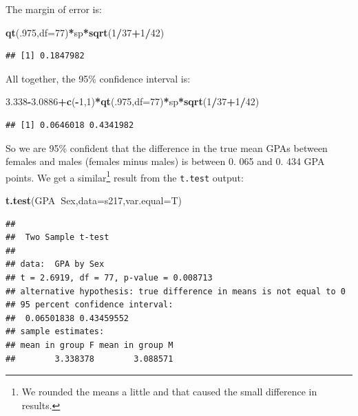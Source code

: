 \documentclass[]{book}
\newenvironment{Shaded}{\begin{snugshade}}{\end{snugshade}}
\newcommand{\KeywordTok}[1]{\textcolor[rgb]{0.13,0.29,0.53}{\textbf{#1}}}
\newcommand{\DataTypeTok}[1]{\textcolor[rgb]{0.13,0.29,0.53}{#1}}
\newcommand{\DecValTok}[1]{\textcolor[rgb]{0.00,0.00,0.81}{#1}}
\newcommand{\FloatTok}[1]{\textcolor[rgb]{0.00,0.00,0.81}{#1}}
\newcommand{\OperatorTok}[1]{\textcolor[rgb]{0.81,0.36,0.00}{\textbf{#1}}}
\newcommand{\NormalTok}[1]{#1}
\let\rmarkdownfootnote\footnote%
\def\footnote{\protect\rmarkdownfootnote}
\begin{document}
The margin of error is:

\begin{Shaded}
\begin{Highlighting}[]
\KeywordTok{qt}\NormalTok{(.}\DecValTok{975}\NormalTok{,}\DataTypeTok{df=}\DecValTok{77}\NormalTok{)}\OperatorTok{*}\NormalTok{sp}\OperatorTok{*}\KeywordTok{sqrt}\NormalTok{(}\DecValTok{1}\OperatorTok{/}\DecValTok{37}\OperatorTok{+}\DecValTok{1}\OperatorTok{/}\DecValTok{42}\NormalTok{)}
\end{Highlighting}
\end{Shaded}

\begin{verbatim}
## [1] 0.1847982
\end{verbatim}

All together, the 95\% confidence interval is:

\begin{Shaded}
\begin{Highlighting}[]
\FloatTok{3.338}\OperatorTok{-}\FloatTok{3.0886}\OperatorTok{+}\KeywordTok{c}\NormalTok{(}\OperatorTok{-}\DecValTok{1}\NormalTok{,}\DecValTok{1}\NormalTok{)}\OperatorTok{*}\KeywordTok{qt}\NormalTok{(.}\DecValTok{975}\NormalTok{,}\DataTypeTok{df=}\DecValTok{77}\NormalTok{)}\OperatorTok{*}\NormalTok{sp}\OperatorTok{*}\KeywordTok{sqrt}\NormalTok{(}\DecValTok{1}\OperatorTok{/}\DecValTok{37}\OperatorTok{+}\DecValTok{1}\OperatorTok{/}\DecValTok{42}\NormalTok{)}
\end{Highlighting}
\end{Shaded}

\begin{verbatim}
## [1] 0.0646018 0.4341982
\end{verbatim}

So we are 95\% confident that the difference in the true mean GPAs
between females and males (females minus males) is between 0. 065 and 0.
434 GPA points. We get a similar\footnote{We rounded the means a little
  and that caused the small difference in results.} result from the
\texttt{t.test} output:

\begin{Shaded}
\begin{Highlighting}[]
\KeywordTok{t.test}\NormalTok{(GPA}\OperatorTok{~}\NormalTok{Sex,}\DataTypeTok{data=}\NormalTok{s217,}\DataTypeTok{var.equal=}\NormalTok{T)}
\end{Highlighting}
\end{Shaded}

\begin{verbatim}
## 
##  Two Sample t-test
## 
## data:  GPA by Sex
## t = 2.6919, df = 77, p-value = 0.008713
## alternative hypothesis: true difference in means is not equal to 0
## 95 percent confidence interval:
##  0.06501838 0.43459552
## sample estimates:
## mean in group F mean in group M 
##        3.338378        3.088571
\end{verbatim}
\end{document}
